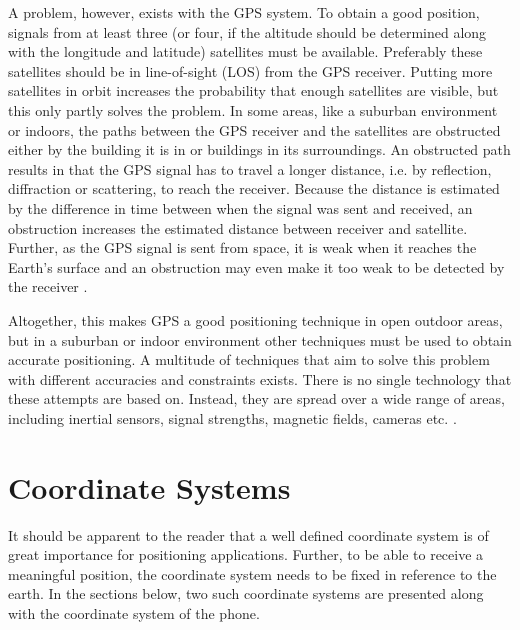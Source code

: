 \documentclass{LTHthesis}
\begin{document}
A problem, however, exists with the GPS system. To obtain a good position, signals from at least three (or four, if the altitude should be determined along with the longitude and latitude) satellites must be available. Preferably these satellites should be in line-of-sight (LOS) from the GPS receiver. Putting more satellites in orbit increases the probability that enough satellites are visible, but this only partly solves the problem. In some areas, like a suburban environment or indoors, the paths between the GPS receiver and the satellites are obstructed either by the building it is in or buildings in its surroundings. An obstructed path results in that the GPS signal has to travel a longer distance, i.e. by reflection, diffraction or scattering, to reach the receiver. Because the distance is estimated by the difference in time between when the signal was sent and received, an obstruction increases the estimated distance between receiver and satellite. Further, as the GPS signal is sent from space, it is weak when it reaches the Earth's surface and an obstruction may even make it too weak to be detected by the receiver \cite{gps_acc}.

Altogether, this makes GPS a good positioning technique in open outdoor areas, but in a suburban or indoor environment other techniques must be used to obtain accurate positioning. A multitude of techniques that aim to solve this problem with different accuracies and constraints exists. There is no single technology that these attempts are based on. Instead, they are spread over a wide range of areas, including inertial sensors, signal strengths, magnetic fields, cameras etc. \cite{positioning_overview}. 
%
\section{Coordinate Systems}
It should be apparent to the reader that a well defined coordinate system is of great importance for positioning applications. Further, to be able to receive a meaningful position, the coordinate system needs to be fixed in reference to the earth. In the sections below, two such coordinate systems are presented along with the coordinate system of the phone. 
\end{document}

